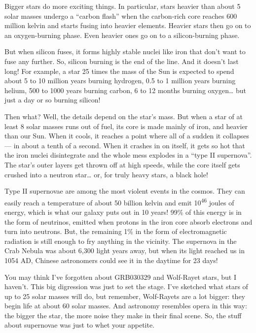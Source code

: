 \documentclass{article}
\def\tightlist{}
\renewcommand{\texttt}[1]{%
  \begingroup
  \ttfamily
  \begingroup\lccode`~=`/\lowercase{\endgroup\def~}{/\discretionary{}{}{}}%
  \begingroup\lccode`~=`[\lowercase{\endgroup\def~}{[\discretionary{}{}{}}%
  \begingroup\lccode`~=`.\lowercase{\endgroup\def~}{.\discretionary{}{}{}}%
  \catcode`/=\active\catcode`[=\active\catcode`.=\active
  \scantokens{#1\noexpand}%
  \endgroup
}
\begin{document}

Bigger stars do more exciting things. In particular, stars heavier than
about 5 solar masses undergo a ``carbon flash'' when the carbon-rich
core reaches 600 million kelvin and starts fusing into heavier elements.
Heavier stars then go on to an oxygen-burning phase. Even heavier ones
go on to a silicon-burning phase.

But when silicon fuses, it forms highly stable nuclei like iron that
don't want to fuse any further. So, silicon burning is the end of the
line. And it doesn't last long! For example, a star 25 times the mass of
the Sun is expected to spend about 5 to 10 million years burning
hydrogen, 0.5 to 1 million years burning helium, 500 to 1000 years
burning carbon, 6 to 12 months burning oxygen\ldots{} but just a day or
so burning silicon!

Then what? Well, the details depend on the star's mass. But when a star
of at least 8 solar masses runs out of fuel, its core is made mainly of
iron, and heavier than our Sun. When it cools, it reaches a point where
all of a sudden it collapses --- in about a tenth of a second. When it
crashes in on itself, it gets so hot that the iron nuclei disintegrate
and the whole mess explodes in a ``type II supernova''. The star's outer
layers get thrown off at high speeds, while the core itself gets crushed
into a neutron star\ldots{} or, for truly heavy stars, a black hole!

Type II supernovae are among the most violent events in the cosmos. They
can easily reach a temperature of about 50 billion kelvin and emit
10\textsuperscript{46} joules of energy, which is what our galaxy puts
out in 10 years! 99\% of this energy is in the form of neutrinos,
emitted when protons in the iron core absorb electrons and turn into
neutrons. But, the remaining 1\% in the form of electromagnetic
radiation is still enough to fry anything in the vicinity. The supernova
in the Crab Nebula was about 6,300 light years away, but when its light
reached us in 1054 AD, Chinese astronomers could see it in the daytime
for 23 days!

You may think I've forgotten about GRB030329 and Wolf-Rayet stars, but I
haven't. This big digression was just to set the stage. I've sketched
what stars of up to 25 solar masses will do, but remember, Wolf-Rayets
are a lot bigger: they begin life at about 60 solar masses. And
astronomy resembles opera in this way: the bigger the star, the more
noise they make in their final scene. So, the stuff about supernovae was
just to whet your appetite.
\end{document}
